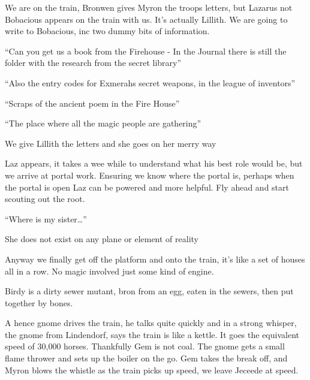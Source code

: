 We are on the train, Bronwen gives Myron the troops letters, but Lazarus not Bobacious appears on the train with us. It's actually Lillith. We are going to write to Bobacious, inc two dummy bits of information.\medskip

“Can you get us a book from the Firehouse - In the Journal there is still the folder with the research from the secret library”\medskip

“Also the entry codes for Exmerahs secret weapons, in the league of inventors”\medskip

“Scraps of the ancient poem in the Fire House”\medskip

“The place where all the magic people are gathering”\medskip

We give Lillith the letters and she goes on her merry way\medskip

Laz appears, it takes a wee while to understand what his best role would be, but we arrive at portal work. Ensuring we know where the portal is, perhaps when the portal is open Laz can be powered and more helpful. Fly ahead and start scouting out the root.\medskip

“Where is my sister…”\medskip

She does not exist on any plane or element of reality\medskip

Anyway we finally get off the platform and onto the train, it's like a set of houses all in a row. No magic involved just some kind of engine.\medskip

Birdy is a dirty sewer mutant, bron from an egg, eaten in the sewers, then put together by bones.\medskip

A hence gnome drives the train, he talks quite quickly and in a strong whisper, the gnome from Lindendorf, says the train is like a kettle. It goes the equivalent speed of 30,000 horses. Thankfully Gem is not coal. The gnome gets a small flame thrower and sets up the boiler on the go. Gem takes the break off, and Myron blows the whistle as the train picks up speed, we leave Jeceede at speed.\medskip

\vspace*{5mm}
